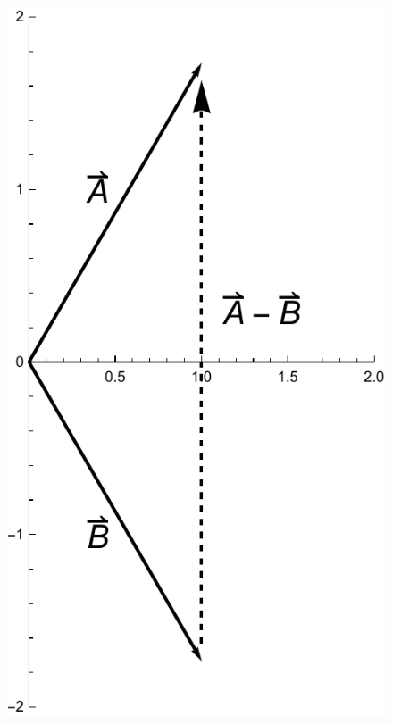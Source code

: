 \documentclass{amsart}
\begin{document}
\begin{figure}[h]
  \begin{minipage}[c]{0.4\textwidth}
    \centering
    \includegraphics[scale=0.32]{1-22c}
  \end{minipage}
  \begin{minipage}[c]{0.4\textwidth}
    \centering

\end{minipage}
\end{figure}
\end{document}
